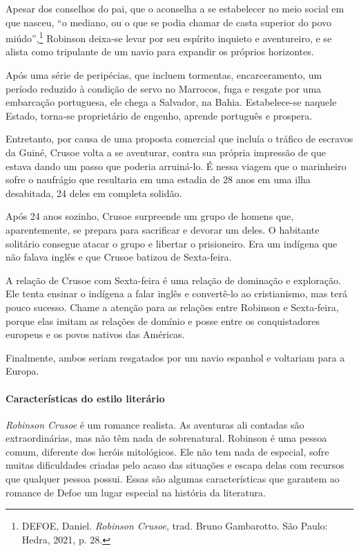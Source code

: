 \documentclass{article}
\begin{document}
Apesar dos conselhos do pai, que o aconselha a se estabelecer no meio
social em que nasceu, ``o mediano, ou o que se podia chamar de casta
superior do povo miúdo'',\footnote{DEFOE, Daniel. \emph{Robinson
  Crusoe}, trad. Bruno Gambarotto. São Paulo: Hedra, 2021, p. 28.}
Robinson deixa-se levar por seu espírito inquieto e aventureiro, e se
alista como tripulante de um navio para expandir os próprios horizontes.

Após uma série de peripécias, que incluem tormentas, encarceramento, um
período reduzido à condição de servo no Marrocos, fuga e resgate por uma
embarcação portuguesa, ele chega a Salvador, na Bahia. Estabelece-se
naquele Estado, torna-se proprietário de engenho, aprende português e
prospera.

Entretanto, por causa de uma proposta comercial que incluía o tráfico de
escravos da Guiné, Crusoe volta a se aventurar, contra sua própria
impressão de que estava dando um passo que poderia arruiná-lo. É nessa
viagem que o marinheiro sofre o naufrágio que resultaria em uma estadia
de 28 anos em uma ilha desabitada, 24 deles em completa solidão.

Após 24 anos sozinho, Crusoe surpreende um grupo de homens que,
aparentemente, se prepara para sacrificar e devorar um deles. O
habitante solitário consegue atacar o grupo e libertar o prisioneiro.
Era um indígena que não falava inglês e que Crusoe batizou de
Sexta-feira.

A relação de Crusoe com Sexta-feira é uma relação de dominação e
exploração. Ele tenta ensinar o indígena a falar inglês e convertê-lo ao
cristianismo, mas terá pouco sucesso. Chame a atenção para as relações
entre Robinson e Sexta-feira, porque elas imitam as relações de domínio
e posse entre os conquistadores europeus e os povos nativos das
Américas.

Finalmente, ambos seriam resgatados por um navio espanhol e voltariam
para a Europa.

\paragraph{Características do estilo literário}
\emph{Robinson Crusoe} é um romance realista. As aventuras ali contadas
são extraordinárias, mas não têm nada de sobrenatural. Robinson é uma
pessoa comum, diferente dos heróis mitológicos. Ele não tem nada de
especial, sofre muitas dificuldades criadas pelo acaso das situações e
escapa delas com recursos que qualquer pessoa possui. Essas são algumas
características que garantem ao romance de Defoe um lugar especial na
história da literatura.
\end{document}
